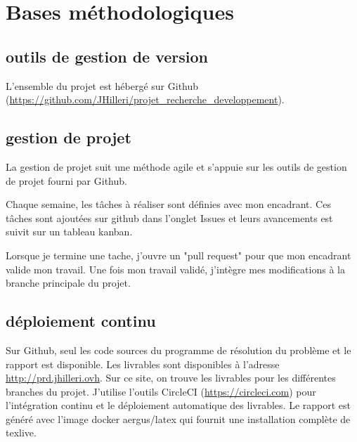 \section{Bases méthodologiques}
\subsection{outils de gestion de version}
L'ensemble du projet est hébergé sur Github (\url{https://github.com/JHilleri/projet_recherche_developpement}).

\subsection{gestion de projet}
La gestion de projet suit une méthode agile et s'appuie sur les outils de gestion de projet fourni par Github.

Chaque semaine, les tâches à réaliser sont définies avec mon encadrant.
Ces tâches sont ajoutées sur github dans l'onglet Issues et leurs avancements est suivit sur un tableau kanban.

Lorsque je termine une tache, j'ouvre un "pull request" pour que mon encadrant valide mon travail.
Une fois mon travail validé, j'intègre mes modifications à la branche principale du projet.

\subsection{déploiement continu}
Sur Github, seul les code sources du programme de résolution du problème et le rapport est disponible.
Les livrables sont disponibles à l'adresse \url{http://prd.jhilleri.ovh}.
Sur ce site, on trouve les livrables pour les différentes branches du projet.
J'utilise l'outils CircleCI (\url{https://circleci.com}) pour l'intégration continu 
    et le déploiement automatique des livrables.
Le rapport est généré avec l'image docker aergus/latex qui fournit une installation complète de texlive.
